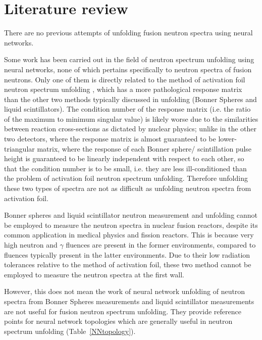 \documentclass[a4paper, 12pt]{article}
\begin{document}
\section{Literature review}\label{Literature review}
    There are no previous attempts of unfolding fusion neutron spectra using neural networks.

    Some work has been carried out in the field of neutron spectrum unfolding using neural networks, none of which pertains specifically to neutron spectra of fusion neutrons. Only one of them is directly related to the method of activation foil neutron spectrum unfolding \cite{Accelerator-basedANNUnfolding}, which has a more pathological response matrix than the other two methods typically discussed in unfolding (Bonner Spheres and liquid scintillators). The condition number of the response matrix (i.e. the ratio of the maximum to minimum singular value\cite{MATLAB}) is likely worse due to the similarities between reaction cross-sections as dictated by nuclear physics; unlike in the other two detectors, where the response matrix is almost guaranteed to be lower-triangular matrix, where the response of each Bonner sphere/ scintillation pulse height is guaranteed to be linearly independent with respect to each other, so that the condition number is to be small, i.e. they are less ill-conditioned than the problem of activation foil neutron spectrum unfolding. Therefore unfolding these two types of spectra are not as difficult as unfolding neutron spectra from activation foil.

    Bonner spheres and liquid scintillator neutron measurement and unfolding cannot be employed to measure the neutron spectra in nuclear fusion reactors, despite its common application in medical physics and fission reactors.
    This is because very high neutron and $\gamma$ fluences are present in the former environments, compared to fluences typically present in the latter environments.
    Due to their low radiation tolerances relative to the method of activation foil, these two method cannot be employed to measure the neutron spectra at the first wall.

    However, this does not mean the work of neural network unfolding of neutron spectra from Bonner Spheres measurements
    \cite{Rodrigues-UnfoldingCompuerCodeBasedOnANN} %
    \cite{RDANNM} %
    \cite{ANNDoseQuantitiesPrediction} %
    \cite{ClaudiaC.BonnerSphereNNUnfolding} %
    and liquid scintillator measurements
    \cite{ANN-ModifiedLeastSquare} %
    are not useful for fusion neutron spectrum unfolding. They provide reference points for neural network topologies which are generally useful in neutron spectrum unfolding (Table~\ref{NNtopology}).
\end{document}
